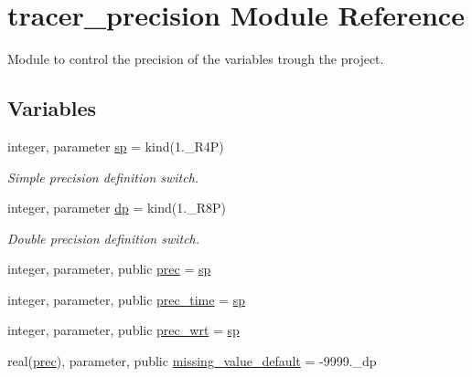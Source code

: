 \hypertarget{namespacetracer__precision}{}\section{tracer\+\_\+precision Module Reference}
\label{namespacetracer__precision}


Module to control the precision of the variables trough the project.  


\subsection*{Variables}
\begin{DoxyCompactItemize}
\item 
integer, parameter \mbox{\hyperlink{namespacetracer__precision_aaa3f9cb7ed44699611a16d61ca9131fb}{sp}} = kind(1.\+\_\+\+R4P)
\begin{DoxyCompactList}\small\item\em Simple precision definition switch. \end{DoxyCompactList}\item 
integer, parameter \mbox{\hyperlink{namespacetracer__precision_a21febe1c6d584cd6b7995a7abc568efb}{dp}} = kind(1.\+\_\+\+R8P)
\begin{DoxyCompactList}\small\item\em Double precision definition switch. \end{DoxyCompactList}\item 
integer, parameter, public \mbox{\hyperlink{namespacetracer__precision_a8a01094f67c69ab389329d205a7c4cc6}{prec}} = \mbox{\hyperlink{namespacetracer__precision_aaa3f9cb7ed44699611a16d61ca9131fb}{sp}}
\item 
integer, parameter, public \mbox{\hyperlink{namespacetracer__precision_acd72fad1267e87137f00ec7d21d5a0cb}{prec\+\_\+time}} = \mbox{\hyperlink{namespacetracer__precision_aaa3f9cb7ed44699611a16d61ca9131fb}{sp}}
\item 
integer, parameter, public \mbox{\hyperlink{namespacetracer__precision_a57302c8b2d241e00360158d172f89d3c}{prec\+\_\+wrt}} = \mbox{\hyperlink{namespacetracer__precision_aaa3f9cb7ed44699611a16d61ca9131fb}{sp}}
\item 
real(\mbox{\hyperlink{namespacetracer__precision_a8a01094f67c69ab389329d205a7c4cc6}{prec}}), parameter, public \mbox{\hyperlink{namespacetracer__precision_ac24699f2eab5a0427f3ec0f8f7715a40}{missing\+\_\+value\+\_\+default}} = -\/9999.\+\_\+dp
\item 

\end{DoxyCompactItemize}
